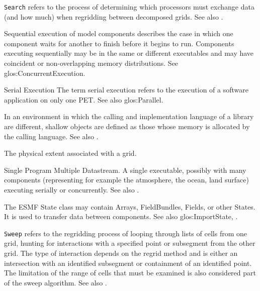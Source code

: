 \begin{description}
\label{glos:Search} 
\item[Search]
  {\tt Search} refers to the process of determining which processors must
  exchange data (and how much) when regridding between decomposed grids.
  See also .

\label{glos:SequentialExecution}
\item[Sequential execution] 
  Sequential execution of model components describes the case in which 
  one component waits for another to finish before it begins
  to run.  Components executing sequentially may be in the same or 
  different executables and may have coincident or non-overlapping 
  memory distributions.  See 
  {glos:ConcurrentExecution}.

\label{glos:Serial}
\item{Serial Execution}
  The term serial execution refers to the execution of a software
  application on only one PET.  See also 
  {glos:Parallel}.

\label{glos:ShallowObjects} 
\item[Shallow object] 
  In an environment
  in which the calling and implementation language of a library are
  different, shallow objects are defined as those whose memory is 
  allocated by the calling language. 
  See also .

\label{glos:Span} 
\item[Span] 
  The physical extent associated with a grid.

\label{glos:SPMD} 
\item[SPMD] 
  Single Program Multiple Datastream. 
  A single executable, possibly with many components (representing 
  for example the atmosphere, the ocean, land surface) executing 
  serially or concurrently. See also . 

\label{glos:State} 
\item [State] 
  The ESMF State class may 
  contain Arrays, FieldBundles, Fields, or other States.  It is used to 
  transfer data between components.  See also 
  {glos:ImportState}, .

\label{glos:Sweep} 
\item[Sweep]
  {\tt Sweep} refers to the regridding process of looping through lists of cells
  from one grid, hunting for interactions with a specified point or subsegment
  from the other grid.  The type of interaction depends on the regrid method
  and is either an intersection with an identified subsegment or containment
  of an identified point.  The limitation of the range of cells that must be
  examined is also considered part of the sweep algorithm.
  See also .


\end{description}
